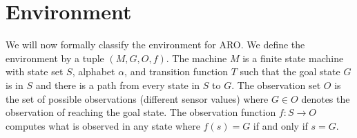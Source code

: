 \documentclass[letterpaper]{article} %
\begin{document}

\section{Environment}

We will now formally classify the environment for ARO. We define the environment by a tuple $(M, G, O, f)$. The machine $M$ is a finite state machine with state set $S$, alphabet $\alpha$, and transition function $T$ such that the goal state $G$ is in $S$ and there is a path from every state in $S$ to $G$. The observation set $O$ is the set of possible observations (different sensor values) where $G \in O$ denotes the observation of reaching the goal state. The observation function $f: S \rightarrow O$ computes what is observed in any state where $f(s) = G$ if and only if $s = G$. 
\end{document}
